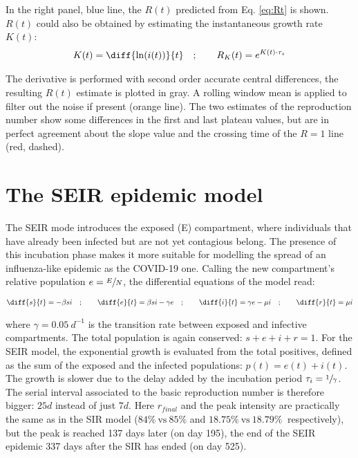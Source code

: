 \documentclass[DIV=12, BCOR=0pt]{scrartcl}  %
\begin{document}
  In the right panel, blue line, the $R(t)$ predicted from Eq. \ref{eq:Rt} is shown. $R(t)$ could also be obtained by estimating the instantaneous growth rate $K(t)$:
  \begin{align}
  	K(t) =  \diff{\ln(i(t))}{t} \quad ; \qquad  R_{K}(t) = e^{K(t) \cdot \tau_{s}}
  \end{align}

	The derivative is performed with second order accurate central differences, the resulting $R(t)$ estimate is plotted in gray. A rolling window mean is applied to filter out the noise if present (orange line). The two estimates of the reproduction number show some differences in the first and last plateau values, but are in perfect agreement about the slope value and the crossing time of the $R = 1$ line (red, dashed).
  
  
  \section{The SEIR epidemic model}
  The SEIR mode introduces the exposed (E) compartment, where individuals that have already been infected but are not yet contagious belong. The presence of this incubation phase makes it more suitable for modelling the spread of an influenza-like epidemic as the COVID-19 one. Calling the new compartment's relative population $e = \sfrac{E}{N}$, the differential equations of the model read:
  
  \begin{align}
  	\diff{s}{t} = - \beta s i \quad;  \qquad 	\diff{e}{t} = \beta s i - \gamma e \quad; \qquad \diff{i}{t} = \gamma e - \mu i \quad; \qquad \diff{r}{t} = \mu i
  \end{align}
  
  where $\gamma = 0.05 \ d^{-1}$ is the transition rate between exposed and infective compartments. The total population is again conserved: $ s + e + i + r = 1$. For the SEIR model, the exponential growth is evaluated from the total positives, defined as the sum of the exposed and the infected populations: $p(t) = e(t) + i(t)$. The growth is slower due to the delay added by the incubation period $\tau_{i}=\sfrac{1}{\gamma}$. The serial interval associated to the basic reproduction number is therefore bigger: $25 d$ instead of just $7 d$. Here $r_{final}$ and the peak intensity are practically the same as in the SIR model ($84 \% \ \mathrm{vs} \ 85 \%$ and $18.75 \% \ \mathrm{vs} \ 18.79 \% \ $ respectively), but the peak is reached 137 days later (on day 195), the end of the SEIR epidemic 337 days after the SIR has ended (on day 525). %
  
\end{document}
